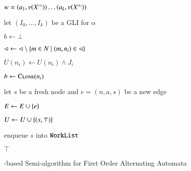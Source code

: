 \begin{algorithm}[htb]
\begin{algorithmic}[1]
   $w = (a_1,\nu({X}^{\scriptscriptstyle{({1})}})) \ldots (a_k,\nu({X}^{\scriptscriptstyle{({k})}}))$
  \label{ln:impact-nonempty}

  \Else {}

  \State let $(I_0,\ldots,I_k)$ be a GLI for $\alpha$
  \label{ln:refine-begin}

  \State $b \leftarrow \bot$



  \State $\lhd \leftarrow \lhd \setminus \{  m \in N \mid (m,n_i) \in \lhd  \}$
  
  \State $U(n_i) \leftarrow U(n_i) \wedge J_i$


  \State $b \leftarrow \Call{Close}{n_i}$
  \label{ln:refine-end}

  \EndIf %

  \EndIf %

  \EndFor 

  \EndIf %


  \label{ln:expand-begin}

  \State let $s$ be a fresh node and $e = (n,a,s)$ be a new edge

  \State $E \leftarrow E \cup \{ e \}$
  \label{ln:edge-insert}

  \State $U \leftarrow U \cup \{ (s,\top) \}$

  \State enqueue $s$ into $\mathtt{WorkList}$
  \label{ln:expand-end}

  \EndFor

  \EndIf %

  \EndWhile  

   $\top$
\end{algorithmic}
\caption{\impact-based Semi-algorithm for First Order Alternating Automata}
\label{alg:impact}
\end{algorithm}

